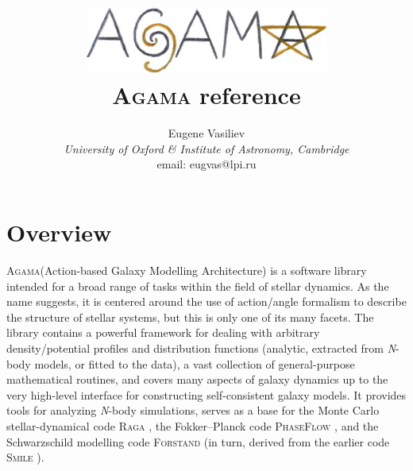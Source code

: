 \documentclass[12pt]{article}
\newcommand{\Agama}{\textsc{Agama}\xspace}
\newcommand{\Nbody}{\textsl{N}-body\xspace}
\begin{document}
\title{\vspace*{-10mm}
\includegraphics[width=8cm]{agama.jpg}\protect\\[5mm]\Agama reference}
\author{Eugene Vasiliev\\
\normalsize\textit{University of Oxford \& Institute of Astronomy, Cambridge}\\
\normalsize\textrm{email: eugvas@lpi.ru} }

\maketitle
\vspace*{-10mm}
\tableofcontents
\newpage

\section{Overview}

\Agama (Action-based Galaxy Modelling Architecture) is a software library intended for a broad range of tasks within the field of stellar dynamics. As the name suggests, it is centered around the use of action/angle formalism to describe the structure of stellar systems, but this is only one of its many facets. The library contains a powerful framework for dealing with arbitrary density/potential profiles and distribution functions (analytic, extracted from \Nbody models, or fitted to the data), a vast collection of general-purpose mathematical routines, and covers many aspects of galaxy dynamics up to the very high-level interface for constructing self-consistent galaxy models. It provides tools for analyzing \Nbody simulations, serves as a base for the Monte Carlo stellar-dynamical code \textsc{Raga} \cite{Vasiliev2015}, the Fokker--Planck code \textsc{PhaseFlow} \cite{Vasiliev2017}, and the Schwarzschild modelling code \textsc{Forstand} \cite{VasilievValluri2020} (in turn, derived from the earlier code \textsc{Smile} \cite{Vasiliev2013,VasilievAthanassoula2015}).
\end{document}

